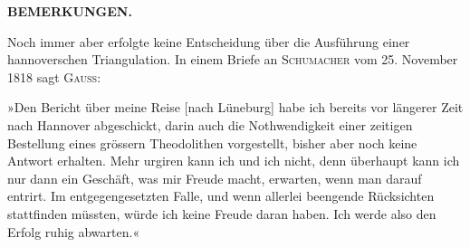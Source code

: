 \par\clearpage
\noindent{}\hfill\textbf{BEMERKUNGEN.}\hfill\null\par\medskip
\par\noindent\hspace*{\parindent}Noch immer aber erfolgte keine Entscheidung über die Ausführung einer hannoverschen Triangulation. In einem Briefe an \textsc{Schumacher} vom 25. November 1818 sagt \textsc{Gauss}:

\par\noindent\hspace*{\parindent}»Den Bericht über meine Reise [nach Lüneburg] habe ich bereits vor längerer Zeit nach Hannover abgeschickt, darin auch die Nothwendigkeit einer zeitigen Bestellung eines grössern Theodolithen vorgestellt, bisher aber noch keine Antwort erhalten. Mehr urgiren kann ich und  ich nicht, denn überhaupt kann ich nur dann ein Geschäft, was mir Freude macht, erwarten, wenn man  darauf entrirt. Im entgegengesetzten Falle, und wenn allerlei beengende Rücksichten stattfinden müssten, würde ich keine Freude daran haben. Ich werde also den Erfolg ruhig abwarten.«

